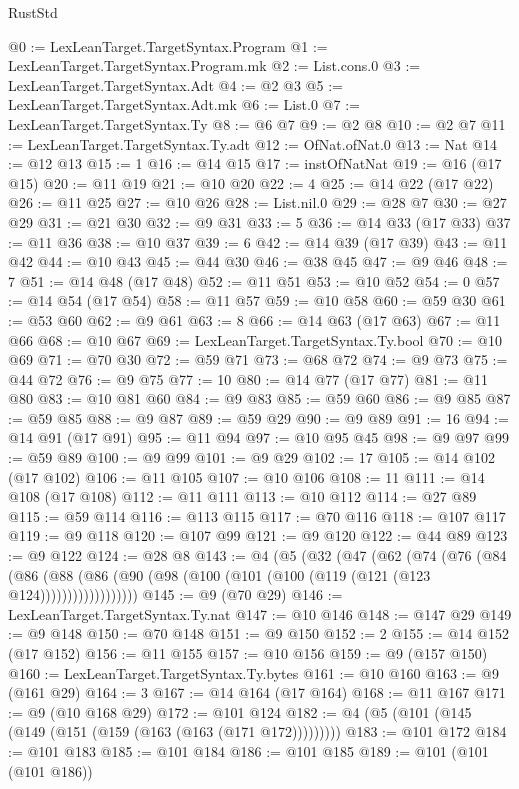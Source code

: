 \begin{lexlean}{RustStd}
\begin{coremodule}
{\begin{coremodule}
{{{{{{{{{{{{{{{{@0 := LexLeanTarget.TargetSyntax.Program
@1 := LexLeanTarget.TargetSyntax.Program.mk
@2 := List.cons.{0}
@3 := LexLeanTarget.TargetSyntax.Adt
@4 := @2 @3
@5 := LexLeanTarget.TargetSyntax.Adt.mk
@6 := List.{0}
@7 := LexLeanTarget.TargetSyntax.Ty
@8 := @6 @7
@9 := @2 @8
@10 := @2 @7
@11 := LexLeanTarget.TargetSyntax.Ty.adt
@12 := OfNat.ofNat.{0}
@13 := Nat
@14 := @12 @13
@15 := 1
@16 := @14 @15
@17 := instOfNatNat
@19 := @16 (@17 @15)
@20 := @11 @19
@21 := @10 @20
@22 := 4
@25 := @14 @22 (@17 @22)
@26 := @11 @25
@27 := @10 @26
@28 := List.nil.{0}
@29 := @28 @7
@30 := @27 @29
@31 := @21 @30
@32 := @9 @31
@33 := 5
@36 := @14 @33 (@17 @33)
@37 := @11 @36
@38 := @10 @37
@39 := 6
@42 := @14 @39 (@17 @39)
@43 := @11 @42
@44 := @10 @43
@45 := @44 @30
@46 := @38 @45
@47 := @9 @46
@48 := 7
@51 := @14 @48 (@17 @48)
@52 := @11 @51
@53 := @10 @52
@54 := 0
@57 := @14 @54 (@17 @54)
@58 := @11 @57
@59 := @10 @58
@60 := @59 @30
@61 := @53 @60
@62 := @9 @61
@63 := 8
@66 := @14 @63 (@17 @63)
@67 := @11 @66
@68 := @10 @67
@69 := LexLeanTarget.TargetSyntax.Ty.bool
@70 := @10 @69
@71 := @70 @30
@72 := @59 @71
@73 := @68 @72
@74 := @9 @73
@75 := @44 @72
@76 := @9 @75
@77 := 10
@80 := @14 @77 (@17 @77)
@81 := @11 @80
@83 := @10 @81 @60
@84 := @9 @83
@85 := @59 @60
@86 := @9 @85
@87 := @59 @85
@88 := @9 @87
@89 := @59 @29
@90 := @9 @89
@91 := 16
@94 := @14 @91 (@17 @91)
@95 := @11 @94
@97 := @10 @95 @45
@98 := @9 @97
@99 := @59 @89
@100 := @9 @99
@101 := @9 @29
@102 := 17
@105 := @14 @102 (@17 @102)
@106 := @11 @105
@107 := @10 @106
@108 := 11
@111 := @14 @108 (@17 @108)
@112 := @11 @111
@113 := @10 @112
@114 := @27 @89
@115 := @59 @114
@116 := @113 @115
@117 := @70 @116
@118 := @107 @117
@119 := @9 @118
@120 := @107 @99
@121 := @9 @120
@122 := @44 @89
@123 := @9 @122
@124 := @28 @8
@143 := @4
    (@5
      (@32
        (@47
          (@62
            (@74
              (@76
                (@84
                  (@86
                    (@88 (@86 (@90 (@98 (@100 (@101 (@100 (@119 (@121 (@123 @124))))))))))))))))))
@145 := @9 (@70 @29)
@146 := LexLeanTarget.TargetSyntax.Ty.nat
@147 := @10 @146
@148 := @147 @29
@149 := @9 @148
@150 := @70 @148
@151 := @9 @150
@152 := 2
@155 := @14 @152 (@17 @152)
@156 := @11 @155
@157 := @10 @156
@159 := @9 (@157 @150)
@160 := LexLeanTarget.TargetSyntax.Ty.bytes
@161 := @10 @160
@163 := @9 (@161 @29)
@164 := 3
@167 := @14 @164 (@17 @164)
@168 := @11 @167
@171 := @9 (@10 @168 @29)
@172 := @101 @124
@182 := @4 (@5 (@101 (@145 (@149 (@151 (@159 (@163 (@163 (@171 @172)))))))))
@183 := @101 @172
@184 := @101 @183
@185 := @101 @184
@186 := @101 @185
@189 := @101 (@101 (@101 @186))
}}}}}}}}}}}}}}}}
\end{coremodule}}
\end{coremodule}
\end{lexlean}

